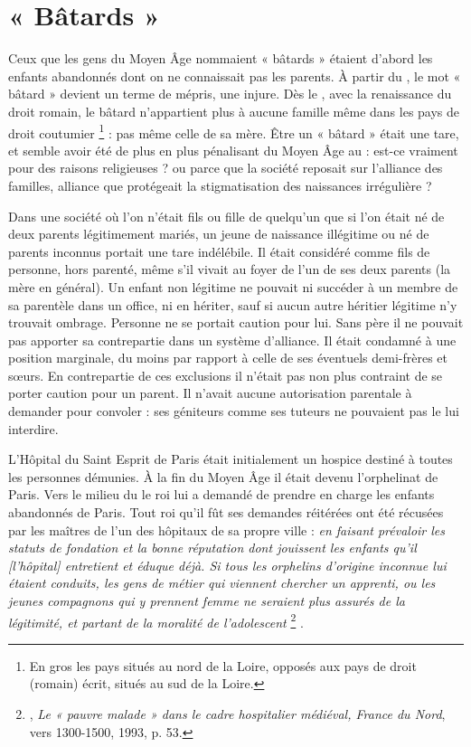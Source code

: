 \section{« Bâtards »}

 Ceux que les gens du Moyen Âge nommaient « bâtards » étaient d'abord les enfants abandonnés dont on ne connaissait pas les parents. À partir du , le mot « bâtard » devient un terme de mépris, une injure. Dès le , avec la renaissance du droit romain, le bâtard n'appartient plus à aucune famille même dans les pays de droit coutumier%
\footnote{En gros les pays situés au nord de la Loire, opposés aux pays de droit (romain) écrit, situés au sud de la Loire.} 
: pas même celle de sa mère. Être un « bâtard » était une tare, et semble avoir été de plus en plus pénalisant du Moyen Âge au  : est-ce vraiment pour des raisons religieuses ? ou parce que la société reposait sur l'alliance des familles, alliance que protégeait la stigmatisation des naissances irrégulière ?

 Dans une société où l'on n'était fils ou fille de quelqu'un que si l'on était né de deux parents légitimement mariés, un jeune de naissance illégitime ou né de parents inconnus portait une tare indélébile. Il était considéré comme fils de personne, hors parenté, même s'il vivait au foyer de l'un de ses deux parents (la mère en général). Un enfant non légitime ne pouvait ni succéder à un membre de sa parentèle dans un office, ni en hériter, sauf si aucun autre héritier légitime n'y trouvait ombrage. Personne ne se portait caution pour lui. Sans père il ne pouvait pas apporter sa contrepartie dans un système d'alliance. Il était condamné à une position marginale, du moins par rapport à celle de ses éventuels demi-frères et sœurs. En contrepartie de ces exclusions il n'était pas non plus contraint de se porter caution pour un parent. Il n'avait aucune autorisation parentale à demander pour convoler : ses géniteurs comme ses tuteurs ne pouvaient pas le lui interdire.

 L'Hôpital du Saint Esprit de Paris était initialement un hospice destiné à toutes les personnes démunies. À la fin du Moyen Âge il était devenu l'orphelinat de Paris. Vers le milieu du  le roi lui a demandé de prendre en charge les enfants abandonnés de Paris. Tout roi qu'il fût ses demandes réitérées ont été récusées par les maîtres de l'un des hôpitaux de sa propre ville : \emph{en faisant prévaloir les statuts de fondation et la bonne réputation dont jouissent les enfants qu'il \emph{[l'hôpital]} entretient et éduque déjà. Si tous les orphelins d'origine inconnue lui étaient conduits, les gens de métier qui viennent chercher un apprenti, ou les jeunes compagnons qui y prennent femme ne seraient plus assurés de la légitimité, et partant de la moralité de l'adolescent}%
\footnote{, \emph{Le « pauvre malade » dans le cadre hospitalier médiéval, France du Nord}, vers 1300-1500, 1993, p. 53.}%
.

